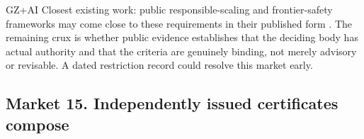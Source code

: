 \begin{authbar}{GZ+AI}
Closest existing work: public responsible-scaling and frontier-safety frameworks may come close to these requirements in their published form \autocite{anthropic2024rsp,deepmind2026fsf,openai2026preparednessframework}.
The remaining crux is whether public evidence establishes that the deciding body has actual authority and that the criteria are genuinely binding, not merely advisory or revisable.
A dated restriction record could resolve this market early.
\end{authbar}
\authbarneedspace

\subsection{Market 15. Independently issued certificates compose}
\label{sec:appp-m15}

